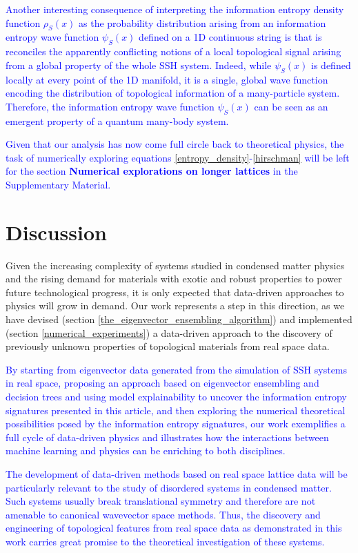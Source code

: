 \documentclass[10pt]{revtex4-1}
\begin{document}
\textcolor{blue}{
Another interesting consequence of interpreting the information entropy density function $\rho_S(x)$ as the probability distribution arising from an information entropy wave function $\psi_S(x)$ defined on a 1D continuous string is that is reconciles the apparently conflicting notions of a local topological signal arising from a global property of the whole SSH system. Indeed, while $\psi_S(x)$ is defined locally at every point of the 1D manifold, it is a single, global wave function encoding the distribution of topological information of a many-particle system. Therefore, the information entropy wave function $\psi_S(x)$ can be seen as an emergent property of a quantum many-body system.    
}

\textcolor{blue}{
Given that our analysis has now come full circle back to theoretical physics, the task of numerically exploring equations \eqref{entropy_density}-\eqref{hirschman} will be left for the section \textbf{Numerical explorations on longer lattices} in the Supplementary Material.
}




\section{Discussion}
\label{discussion}

Given the increasing complexity of systems studied in condensed matter physics and the rising demand for materials with exotic and robust properties to power future technological progress, it is only expected that data-driven approaches to physics will grow in demand. Our work represents a step in this direction, as we have devised (section \ref{the_eigenvector_ensembling_algorithm}) and implemented (section \ref{numerical_experiments}) a data-driven approach to the discovery of previously unknown properties of topological materials from real space data.

\textcolor{blue}{By starting from eigenvector data generated from the simulation of SSH systems in real space, proposing an approach based on eigenvector ensembling and decision trees and using model explainability to uncover the information entropy signatures presented in this article, and then exploring the numerical theoretical possibilities posed by the information entropy signatures, our work exemplifies a full cycle of data-driven physics and illustrates how the interactions between machine learning and physics can be enriching to both disciplines. }     
 
\textcolor{blue}{
The development of data-driven methods based on real space lattice data will be particularly relevant to the study of disordered systems in condensed matter. Such systems usually break translational symmetry and therefore are not amenable to canonical wavevector space methods. Thus, the discovery and engineering of topological features from real space data as demonstrated in this work carries great promise to the theoretical investigation of these systems.
}
\end{document}
